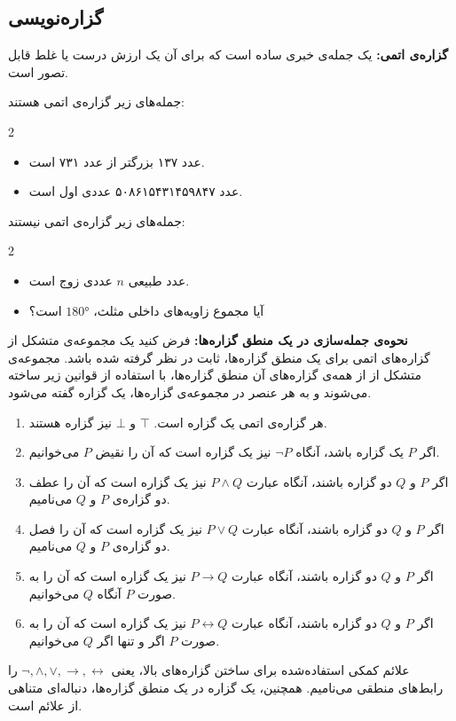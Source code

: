 \subsection{گزاره‌نویسی}

\textbf{گزاره‌ی اتمی:}
یک جمله‌ی خبری ساده است که برای آن یک ارزش درست یا غلط قابل تصور است.
\begin{example}
	جمله‌های زیر گزاره‌ی اتمی هستند:
	\vspace{-0.5cm}
	\begin{multicols}{2}
		\begin{itemize}
			\item 
			عدد ۱۳۷ بزرگتر از عدد ۷۳۱ است.
			\item 
			عدد ۵۰۸۶۱۵۴۳۱۴۵۹۸۴۷ عددی اول است.
		\end{itemize}
	\end{multicols}
\end{example}

\begin{example}
	جمله‌های زیر گزاره‌ی اتمی نیستند:
	\vspace{-0.5cm}
	\begin{multicols}{2}
		\begin{itemize}
			\item 
			عدد طبیعی $n$ عددی زوج است.
			\item 
			آیا مجموع زاویه‌های داخلی مثلث،
			$\ang{180}$
			است؟
		\end{itemize}
	\end{multicols}
\end{example}
\smallskip
\textbf{نحوه‌ی جمله‌سازی در یک منطق گزاره‌ها:}
فرض کنید یک مجموعه‌ی متشکل از گزاره‌های اتمی برای یک منطق گزاره‌ها، ثابت در نظر گرفته شده باشد. مجموعه‌ی متشکل از از همه‌ی گزاره‌های آن منطق گزاره‌ها، با استفاده از قوانین زیر ساخته می‌شوند و به هر عنصر در مجموعه‌ی گزاره‌ها، یک گزاره گفته می‌شود.
\begin{enumerate}
	\item
	هر گزاره‌ی اتمی یک گزاره است. $\top$
	و
	$\bot$
	نیز گزاره هستند.
	\item
	اگر $P$ یک گزاره باشد، آنگاه
	$\neg P$
	نیز یک گزاره است که آن را نقیض $P$ می‌خوانیم.
	\item 
	اگر $P$ و $Q$ دو گزاره باشند، آنگاه عبارت
	$P \wedge Q$
	نیز یک گزاره است که آن را عطف دو گزاره‌ی $P$ و $Q$ می‌نامیم.
	\item 
	اگر $P$ و $Q$ دو گزاره باشند، آنگاه عبارت
	$P \vee Q$
	نیز یک گزاره است که آن را فصل دو گزاره‌ی $P$ و $Q$ می‌نامیم.
	\item 
	اگر $P$ و $Q$ دو گزاره باشند، آنگاه عبارت
	$P \rightarrow Q$
	نیز یک گزاره است که آن را به صورت $P$ آنگاه $Q$ می‌خوانیم.
	\item 
	اگر $P$ و $Q$ دو گزاره باشند، آنگاه عبارت
	$P \leftrightarrow Q$
	نیز یک گزاره است که آن را به صورت $P$ اگر و تنها اگر $Q$ می‌خوانیم.
\end{enumerate}
علائم کمکی استفاده‌شده برای ساختن گزاره‌های بالا، یعنی
$\neg, \wedge, \vee, \rightarrow, \leftrightarrow$
را رابط‌های منطقی می‌نامیم. همچنین، یک گزاره در یک منطق گزاره‌ها، دنباله‌ای متناهی از علائم است.


